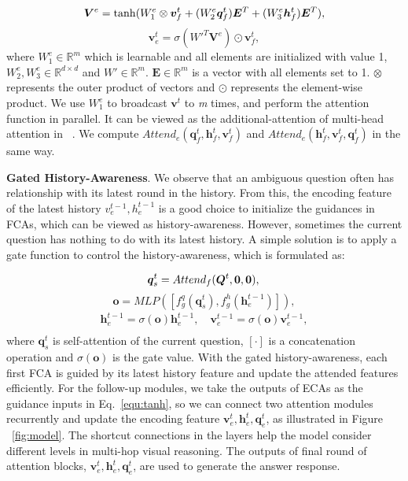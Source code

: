 \documentclass[10pt,twocolumn,letterpaper]{article}
\begin{document}
 \begin{equation}
     \bm{V}^{e}=\tanh(W_{1}^{e}\otimes \\ 
     \bm{v}^t_f+(W_{2}^{e}\bm{q}^t_f)\bm{E}^T+(W_{3}^{e}\bm{h}^t_f)\bm{E}^T),\label{equ:tanh2}
 \end{equation}
 \begin{equation}
     \bm{v}^t_e=\sigma(W'^T \bm{V}^{e}) \odot \bm{v}^t_f,\label{equ:sig}
 \end{equation}
 where $W_{1}^{e} \in \mathbb{R}^{m}$ which is learnable and all elements are initialized with value 1, $W_{2}^e, W_{3}^e \in \mathbb{R}^{d \times d}$ and $W'\in \mathbb{R}^{m}$. $\bm{E} \in \mathbb{R}^{m}$ is a vector with all elements set to 1. $\otimes$ represents the outer product of vectors and $\odot$ represents the element-wise product. We use $W_{1}^{e}$ to broadcast $\bm{v}^t$ to \emph{m} times, and perform the attention function in parallel. It can be viewed as the additional-attention of multi-head attention in ~\cite{vaswani2017attention}.
 We compute $Attend_e(\bm{q}^t_f, \bm{h}^t_f, \bm{v}^t_f)$ and $Attend_e(\bm{h}^t_f, \bm{v}^t_f, \bm{q}^t_f)$ in the same way.
 
\noindent\textbf{Gated History-Awareness}. We observe that an ambiguous question often has relationship with its latest round in the history. From this, the encoding feature of the latest history $v^{t-1}_{e}, h^{t-1}_{e}$ is a good choice to initialize the guidances in FCAs, which can be viewed as history-awareness. However, sometimes the current question has nothing to do with its latest history. A simple solution is to apply a gate function to control the history-awareness, which is formulated as:

\begin{equation}
    \bm{q}_{s}^t = Attend_f(\bm{Q}^t, \bm{0}, \bm{0}), \label{equ:self attention}\\
\end{equation}
\begin{equation}
    \bm{o} = MLP([f^q_{g}(\bm{q}_{s}^t), f^h_{g}(\bm{h}_e^{t-1})]),
\end{equation}
\begin{equation}
    \begin{split}
        \bm{h}^{t-1}_e = \sigma(\bm{o})\bm{h}^{t-1}_e,  \quad \bm{v}^{t-1}_e = \sigma(\bm{o})\bm{v}^{t-1}_e, \\
    \end{split}
\end{equation}
 where $\bm{q}^t_s$ is self-attention of the current question, $[\cdot]$ is a concatenation operation and $\sigma(\bm{o})$ is the gate value. With the gated history-awareness, each first FCA is guided by its latest history feature and update the attended features efficiently. For the follow-up modules, we take the outputs of ECAs as the guidance inputs in Eq.~\eqref{equ:tanh}, so we can connect two attention modules recurrently and update the encoding feature $\bm{v}^t_e, \bm{h}^t_e, \bm{q}^t_e$, as illustrated in Figure ~\ref{fig:model}. The shortcut connections in the layers help the model consider different levels in multi-hop visual reasoning. The outputs of final round of attention blocks, $\bm{v}^t_e, \bm{h}^t_e, \bm{q}^t_e$, are used to generate the answer response.
\end{document}
